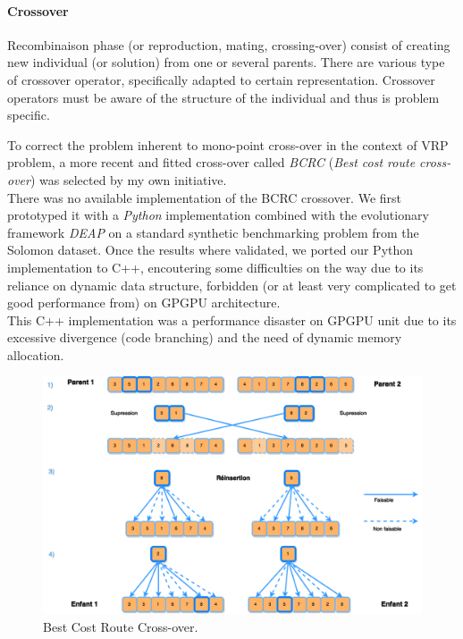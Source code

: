 \documentclass[12pt]{memoir}
\begin{document}
\paragraph{Crossover} %
\label{par:Crossover}
Recombinaison phase (or reproduction, mating, crossing-over) consist of 
creating new individual (or solution) from one or several parents. 
There are various type of crossover operator, specifically adapted to certain 
representation.  Crossover operators must be aware of the structure of the
individual and thus is problem specific.

To correct the problem inherent to mono-point cross-over in the context of VRP 
problem, a more recent and fitted cross-over called \textit{BCRC\cite{ombuki2006multi}}
(\emph{Best cost route cross-over}) was selected by my own initiative. \\
There was no available implementation of the BCRC crossover. We first prototyped it
with a \textit{Python} implementation combined with the evolutionary framework
\emph{DEAP} on a standard synthetic benchmarking problem from the Solomon\cite{solomon1987algorithms}
dataset. Once the results where validated, we ported our Python implementation to C++,
encoutering some difficulties on the way due to its reliance on dynamic data structure,
forbidden (or at least very complicated to get good performance from) on GPGPU architecture.\\
This C++ implementation was a performance disaster on GPGPU unit due to its excessive
divergence (code branching) and the need of dynamic memory allocation.  


\begin{figure}[htbp]
	\begin{center}
		\includegraphics[width=6in]{img/BCRC.png}
		\caption{Best Cost Route Cross-over.}
	\end{center}
\end{figure}
\end{document}
